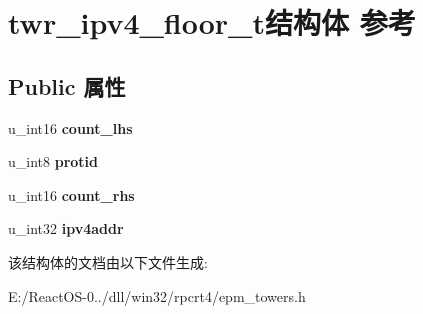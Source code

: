 \hypertarget{structtwr__ipv4__floor__t}{}\section{twr\+\_\+ipv4\+\_\+floor\+\_\+t结构体 参考}
\label{structtwr__ipv4__floor__t}
\subsection*{Public 属性}
\begin{DoxyCompactItemize}
\item 
\mbox{\label{structtwr__ipv4__floor__t_a351749f2d5f1db0f8b50a3b2b040cf8a}} 
u\+\_\+int16 {\bfseries count\+\_\+lhs}
\item 
\mbox{\label{structtwr__ipv4__floor__t_ad47d4706e98955d1a54503da9da8c5d7}} 
u\+\_\+int8 {\bfseries protid}
\item 
\mbox{\label{structtwr__ipv4__floor__t_a70f20fbe4a2ed61d207c964bf2df504a}} 
u\+\_\+int16 {\bfseries count\+\_\+rhs}
\item 
\mbox{\label{structtwr__ipv4__floor__t_a964d55131ba96f2400dbda5fd7b6b93a}} 
u\+\_\+int32 {\bfseries ipv4addr}
\end{DoxyCompactItemize}


该结构体的文档由以下文件生成\+:\begin{DoxyCompactItemize}
\item 
E\+:/\+React\+O\+S-\/0../dll/win32/rpcrt4/epm\+\_\+towers.\+h\end{DoxyCompactItemize}
